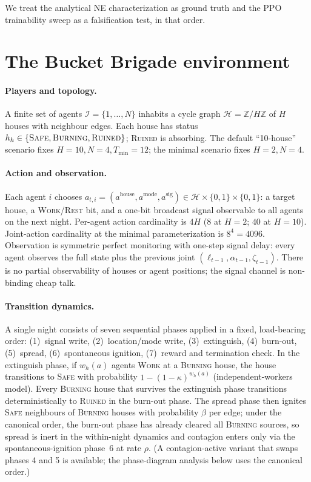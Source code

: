 \documentclass{anvil-paper}
\begin{document}
We treat the analytical NE characterization as ground truth and the PPO
trainability sweep as a falsification test, in that order.

\section{The Bucket Brigade environment}
\label{sec:env}

\paragraph{Players and topology.}
A finite set of agents $\mathcal{I}{=}\{1,\ldots,N\}$ inhabits a cycle graph
$\mathcal{H}{=}\mathbb{Z}/H\mathbb{Z}$ of $H$ houses with neighbour edges. Each
house has status $h_h\in\{\textsc{Safe},\textsc{Burning},\textsc{Ruined}\}$;
\textsc{Ruined} is absorbing. The default ``10-house'' scenario fixes
$H{=}10,N{=}4,T_{\min}{=}12$; the minimal scenario fixes $H{=}2,N{=}4$.

\paragraph{Action and observation.}
Each agent $i$ chooses
$a_{t,i}{=}(a^{\text{house}},a^{\text{mode}},a^{\text{sig}})\in
\mathcal{H}\times\{0,1\}\times\{0,1\}$: a target house, a
\textsc{Work}/\textsc{Rest} bit, and a one-bit broadcast signal observable to
all agents on the next night. Per-agent action cardinality is $4H$ ($8$ at
$H{=}2$; $40$ at $H{=}10$). Joint-action cardinality at the minimal
parameterization is $8^4{=}4096$. Observation is symmetric perfect monitoring
with one-step signal delay: every agent observes the full state plus the
previous joint $(\ell_{t-1},\alpha_{t-1},\zeta_{t-1})$. There is no partial
observability of houses or agent positions; the signal channel is
non-binding cheap talk.

\paragraph{Transition dynamics.}
A single night consists of seven sequential phases applied in a fixed,
load-bearing order: (1)~signal write, (2)~location/mode write,
(3)~extinguish, (4)~burn-out, (5)~spread, (6)~spontaneous ignition,
(7)~reward and termination check. In the extinguish phase, if $w_h(a)$
agents \textsc{Work} at a \textsc{Burning} house, the house transitions to
\textsc{Safe} with probability $1-(1-\kappa)^{w_h(a)}$ (independent-workers
model). Every \textsc{Burning} house that survives the extinguish phase
transitions deterministically to \textsc{Ruined} in the burn-out phase. The
spread phase then ignites \textsc{Safe} neighbours of \textsc{Burning}
houses with probability $\beta$ per edge; under the canonical order, the
burn-out phase has already cleared all \textsc{Burning} sources, so spread is
inert in the within-night dynamics and contagion enters only via the
spontaneous-ignition phase~6 at rate $\rho$. (A contagion-active variant
that swaps phases 4 and 5 is available; the phase-diagram analysis below
uses the canonical order.)
\end{document}

